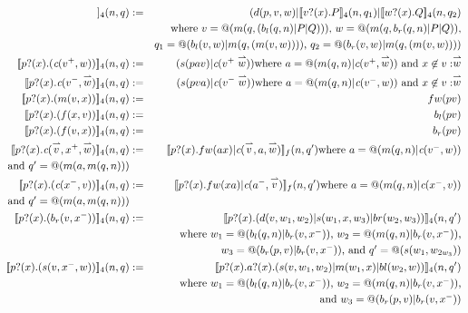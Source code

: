 \documentclass{llncs}
\makeatletter
\newcommand{\ldb}{[\![}
\newcommand{\rdb}{]\!]}
\newcommand{\binpar}[2]{#1 | #2}
\newcommand{\prefix}[3]{#1?(#2) . #3}
\newcommand{\quotep}[1]{\mathsf{@}#1}
\newcommand{\meaningof}[1]{\ldb #1 \rdb}
\newcommand{\vect}[1]{\stackrel{\rightharpoonup}{#1}}
\makeatother
\begin{document}
\begin{eqnarray*}
  \meaningof{\prefix{p}{x}{P|Q}}_4(n, q) 
    & := & 
    (d(p,v,w)|\binpar{\meaningof{\prefix{v}{x}{P}}_{4}(n, q_{1})}{\meaningof{\prefix{w}{x}{Q}}_{4}(n, q_{2}) } \\
    & & \mbox{where $v = \quotep{(m(q,(b_{l}(q,n)|P|Q)))}$, $w = \quotep{(m(q,b_{r}(q,n)|P|Q))}$,} \\
    & & \mbox{$q_{1} = \quotep{(\binpar{b_{l}(v,w)}{m(q,(m(v,w)))})}$, $q_{2} = \quotep{(\binpar{b_{r}(v,w)}{m(q,(m(v,w)))})}$} \\
  \meaningof{\prefix{p}{x}{(\emph{c}(v^{+},w))}}_4(n, q) 
    & := & 
    (s(pav)|\emph{c}(v^{+}\vect{w}))
    \mbox{where $a = @(m(q,n)|\emph{c}(v^{+},\vect{w}))$ and $x \not\in v : \vect{w}$}\\
  \meaningof{\prefix{p}{x}{\emph{c}(v^{-},\vect{w})}}_4(n, q) 
    & := & 
    (s(pva)|\emph{c}(v^{-}\vect{w}))
    \mbox{where $a = @(m(q,n)|\emph{c}(v^{-},w))$ and $x \not\in v : \vect{w}$} \\
  \meaningof{\prefix{p}{x}{(m(v,x))}}_4(n, q) 
    & := & 
    fw(pv) \\
  \meaningof{\prefix{p}{x}{(f(x,v))}}_4(n, q) 
    & := & 
    b_{l}(pv) \\
  \meaningof{\prefix{p}{x}{(f(v,x))}}_4(n, q) 
    & := & 
    b_{r}(pv) \\
  \meaningof{\prefix{p}{x}{\emph{c}(\vect{v},x^{+},\vect{w})}}_4(n, q) 
    & := & 
    \meaningof{\prefix{p}{x}{\binpar{fw(ax)}{\emph{c}(\vect{v},a,\vect{w})}}}_f(n, q')
    \mbox{where $a = @(m(q,n)|\emph{c}(v^{-},w))$} \\
    \mbox{and $q'= \quotep{(m(a,m(q,n)))}$} \\
  \meaningof{\prefix{p}{x}{(\emph{c}(x^{-},v))}}_4(n, q) 
    & := & 
    \meaningof{\prefix{p}{x}{\binpar{fw(xa)}{\emph{c}(a^{-},\vect{v})}}}_f(n, q')
    \mbox{where $a = @(m(q,n)|\emph{c}(x^{-},v))$} \\
    \mbox{and $q'= \quotep{(m(a,m(q,n)))}$} \\
  \meaningof{\prefix{p}{x}{(b_{r}(v,x^{-}))}}_4(n, q) 
    & := & 
    \meaningof{\prefix{p}{x}{(d(v,w_{1},w_{2})|s(w_{1},x,w_{3})|br(w_{2},w_{3}))}}_{4}(n, q') \\
    & & \mbox{where $w_{1} = \quotep{(b_{l}(q,n)|b_{r}(v,x^{-}))}$, $w_{2} = \quotep{(m(q,n)|b_{r}(v,x^{-}))}$,} \\
    & & \mbox{$w_{3} = \quotep{(b_{r}(p,v)|b_{r}(v,x^{-}))}$, and $q' = \quotep{(s(w_{1},w_{2w_{3}}))}$} \\
  \meaningof{\prefix{p}{x}{(s(v,x^{-},w))}}_4(n, q) 
    & := & 
    \meaningof{\prefix{p}{x}{\prefix{a}{x}{(s(v,w_{1},w_{2}) | m(w_{1},x) | bl(w_{2},w))}}}_{4}(n, q') \\
    & & \mbox{where $w_{1} = @(b_{l}(q,n)|b_{r}(v,x^{-}))$, $w_{2} = @(m(q,n)|b_{r}(v,x^{-}))$,} \\
    & & \mbox{and $w_{3} = @(b_{r}(p,v)|b_{r}(v,x^{-}))$}
\end{eqnarray*}
\end{document}

